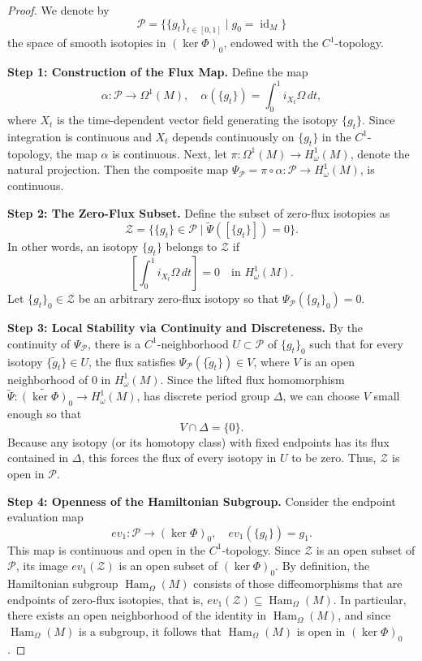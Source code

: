 \documentclass[11pt,a4paper]{amsart}
\theoremstyle{definition}
\theoremstyle{remark}
\newcommand{\Ham}{\operatorname{Ham}}
\newcommand{\id}{\operatorname{id}}
\begin{document}
	\begin{proof}
		We denote by
		\[
		\mathcal{P} = \{ \{g_t\}_{t \in [0,1]} \mid g_0 = \id_M \}
		\]
		the space of smooth isotopies in $(\ker \Phi)_0$, endowed with the $C^1$-topology.
		
		\textbf{Step 1: Construction of the Flux Map.} Define the map
		\[
		\alpha : \mathcal{P} \to \Omega^1(M), \quad \alpha(\{g_t\}) = \int_0^1 i_{X_t}\Omega \, dt,
		\]
		where $X_t$ is the time-dependent vector field generating the isotopy $\{g_t\}$. Since integration is continuous and $X_t$ depends continuously on $\{g_t\}$ in the $C^1$-topology, the map $\alpha$ is continuous. Next, let $\pi : \Omega^1(M) \to H_\omega^1(M)$, denote the natural projection. Then the composite map $\Psi_{\mathcal{P}} = \pi \circ \alpha : \mathcal{P} \to H_\omega^1(M)$, is continuous.
		
		\textbf{Step 2: The Zero-Flux Subset.} Define the subset of zero-flux isotopies as
		\[
		\mathcal{Z} = \{ \{g_t\} \in \mathcal{P} \mid \widetilde{\Psi}([\{g_t\}]) = 0 \}.
		\]
		In other words, an isotopy $\{g_t\}$ belongs to $\mathcal{Z}$ if
		\[
		\left[ \int_0^1 i_{X_t}\Omega \, dt \right] = 0 \quad \text{in } H_\omega^1(M).
		\]
		Let $\{g_t\}_0 \in \mathcal{Z}$ be an arbitrary zero-flux isotopy so that $\Psi_{\mathcal{P}}(\{g_t\}_0) = 0$.
		
		\textbf{Step 3: Local Stability via Continuity and Discreteness.} By the continuity of $\Psi_{\mathcal{P}}$, there is a $C^1$-neighborhood $U \subset \mathcal{P}$ of $\{g_t\}_0$ such that for every isotopy $\{\tilde{g}_t\} \in U$, the flux satisfies $\Psi_{\mathcal{P}}(\{\tilde{g}_t\}) \in V$, where $V$ is an open neighborhood of $0$ in $H_\omega^1(M)$. Since the lifted flux homomorphism $\widetilde{\Psi} : \widetilde{(\ker \Phi)}_0 \to H_\omega^1(M)$, has discrete period group $\Delta$, we can choose $V$ small enough so that
		\[
		V \cap \Delta = \{0\}.
		\]
		Because any isotopy (or its homotopy class) with fixed endpoints has its flux contained in $\Delta$, this forces the flux of every isotopy in $U$ to be zero. Thus, $\mathcal{Z}$ is open in $\mathcal{P}$.
		
		\textbf{Step 4: Openness of the Hamiltonian Subgroup.} Consider the endpoint evaluation map
		\[
		ev_1 : \mathcal{P} \to (\ker \Phi)_0, \quad ev_1(\{g_t\}) = g_1.
		\]
		This map is continuous and open in the $C^1$-topology. Since $\mathcal{Z}$ is an open subset of $\mathcal{P}$, its image $ev_1(\mathcal{Z})$ is an open subset of $(\ker \Phi)_0$. By definition, the Hamiltonian subgroup $\Ham_\Omega(M)$ consists of those diffeomorphisms that are endpoints of zero-flux isotopies, that is, $ev_1(\mathcal{Z}) \subseteq \Ham_\Omega(M)$. In particular, there exists an open neighborhood of the identity in $\Ham_\Omega(M)$, and since $\Ham_\Omega(M)$ is a subgroup, it follows that $\Ham_\Omega(M)$ is open in $(\ker \Phi)_0$.
	\end{proof}
	
\end{document}
